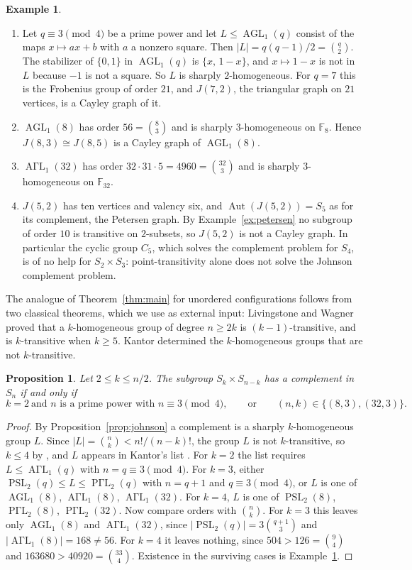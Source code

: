 \documentclass[12pt,letterpaper]{article}
\numberwithin{equation}{section}
\newtheorem{proposition}[theorem]{Proposition}
\theoremstyle{definition}
\newtheorem{example}[theorem]{Example}
\DeclareMathOperator{\agll}{AGL}
\DeclareMathOperator{\agaml}{A\Gamma L}
\DeclareMathOperator{\pgaml}{P\Gamma L}
\DeclareMathOperator{\psll}{PSL}
\DeclareMathOperator{\autt}{Aut}
\begin{document}
\begin{example}\label{ex:homog}
\begin{enumerate}
\item Let $q\equiv3\pmod4$ be a prime power and let $L\leq\agll_1(q)$ consist of the maps $x\mapsto ax+b$ with $a$ a nonzero square. Then $|L|=q(q-1)/2=\binom q2$. The stabilizer of $\{0,1\}$ in $\agll_1(q)$ is $\{x,\,1-x\}$, and $x\mapsto1-x$ is not in $L$ because $-1$ is not a square. So $L$ is sharply $2$-homogeneous. For $q=7$ this is the Frobenius group of order $21$, and $J(7,2)$, the triangular graph on $21$ vertices, is a Cayley graph of it.
\item $\agll_1(8)$ has order $56=\binom83$ and is sharply $3$-homogeneous on $\mathbb F_8$. Hence $J(8,3)\cong J(8,5)$ is a Cayley graph of $\agll_1(8)$.
\item $\agaml_1(32)$ has order $32\cdot31\cdot5=4960=\binom{32}3$ and is sharply $3$-homogeneous on $\mathbb F_{32}$.
\item $J(5,2)$ has ten vertices and valency six, and $\autt(J(5,2))=S_5$ as for its complement, the Petersen graph. By Example~\ref{ex:petersen} no subgroup of order $10$ is transitive on $2$-subsets, so $J(5,2)$ is not a Cayley graph. In particular the cyclic group $C_5$, which solves the complement problem for $S_4$, is of no help for $S_2\times S_3$: point-transitivity alone does not solve the Johnson complement problem.
\end{enumerate}
\end{example}
The analogue of Theorem~\ref{thm:main} for unordered configurations follows from two classical theorems, which we use as external input: Livingstone and Wagner \cite{LW65} proved that a $k$-homogeneous group of degree $n\geq2k$ is $(k-1)$-transitive, and is $k$-transitive when $k\geq5$. Kantor \cite{Ka72} determined the $k$-homogeneous groups that are not $k$-transitive.
\begin{proposition}\label{prop:homogclass}
Let $2\leq k\leq n/2$. The subgroup $S_k\times S_{n-k}$ has a complement in $S_n$ if and only if
\[
k=2\ \text{and $n$ is a prime power with } n\equiv3\pmod 4,\qquad\text{or}\qquad (n,k)\in\{(8,3),(32,3)\}.
\]
\end{proposition}
\begin{proof}
By Proposition~\ref{prop:johnson} a complement is a sharply $k$-homogeneous group $L$. Since $|L|=\binom nk<n!/(n-k)!$, the group $L$ is not $k$-transitive, so $k\leq4$ by \cite{LW65}, and $L$ appears in Kantor's list \cite{Ka72}. For $k=2$ the list requires $L\leq\agaml_1(q)$ with $n=q\equiv3\pmod4$. For $k=3$, either $\psll_2(q)\leq L\leq\pgaml_2(q)$ with $n=q+1$ and $q\equiv3\pmod4$, or $L$ is one of $\agll_1(8)$, $\agaml_1(8)$, $\agaml_1(32)$. For $k=4$, $L$ is one of $\psll_2(8)$, $\pgaml_2(8)$, $\pgaml_2(32)$. Now compare orders with $\binom nk$. For $k=3$ this leaves only $\agll_1(8)$ and $\agaml_1(32)$, since $|\psll_2(q)|=3\binom{q+1}3$ and $|\agaml_1(8)|=168\neq56$. For $k=4$ it leaves nothing, since $504>126=\binom94$ and $163680>40920=\binom{33}4$. Existence in the surviving cases is Example~\ref{ex:homog}.
\end{proof}
\end{document}
